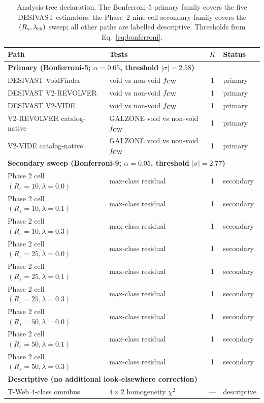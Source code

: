 \documentclass[aps,prd,twocolumn,superscriptaddress,showpacs,preprintnumbers,nofootinbib,longbibliography,floatfix]{revtex4-2}
\begin{document}
\begin{table}[ht]
\caption{Analysis-tree declaration. The Bonferroni-5 primary family
covers the five DESIVAST estimators; the Phase~2 nine-cell secondary
family covers the $(R_s, \lambda_{\rm th})$ sweep; all other paths are
labelled descriptive. Thresholds from Eq.~\eqref{eq:bonferroni}.}
\label{tab:analysis_tree}
\begin{ruledtabular}
\begin{tabular}{llcl}
Path & Tests & $K$ & Status \\
\hline
\multicolumn{4}{l}{\textbf{Primary (Bonferroni-5; $\alpha=0.05$, threshold $|\sigma|=2.58$)}} \\
DESIVAST VoidFinder & void vs non-void $f_{\rm CW}$ & 1 & primary \\
DESIVAST V2-REVOLVER & void vs non-void $f_{\rm CW}$ & 1 & primary \\
DESIVAST V2-VIDE & void vs non-void $f_{\rm CW}$ & 1 & primary \\
V2-REVOLVER catalog-native & GALZONE void vs non-void $f_{\rm CW}$ & 1 & primary \\
V2-VIDE catalog-native & GALZONE void vs non-void $f_{\rm CW}$ & 1 & primary \\
\hline
\multicolumn{4}{l}{\textbf{Secondary sweep (Bonferroni-9; $\alpha=0.05$, threshold $|\sigma|=2.77$)}} \\
Phase 2 cell $(R_s=10,\lambda=0.0)$ & max-class residual & 1 & secondary \\
Phase 2 cell $(R_s=10,\lambda=0.1)$ & max-class residual & 1 & secondary \\
Phase 2 cell $(R_s=10,\lambda=0.3)$ & max-class residual & 1 & secondary \\
Phase 2 cell $(R_s=25,\lambda=0.0)$ & max-class residual & 1 & secondary \\
Phase 2 cell $(R_s=25,\lambda=0.1)$ & max-class residual & 1 & secondary \\
Phase 2 cell $(R_s=25,\lambda=0.3)$ & max-class residual & 1 & secondary \\
Phase 2 cell $(R_s=50,\lambda=0.0)$ & max-class residual & 1 & secondary \\
Phase 2 cell $(R_s=50,\lambda=0.1)$ & max-class residual & 1 & secondary \\
Phase 2 cell $(R_s=50,\lambda=0.3)$ & max-class residual & 1 & secondary \\
\hline
\multicolumn{4}{l}{\textbf{Descriptive (no additional look-elsewhere correction)}} \\
T-Web 4-class omnibus & $4\!\times\!2$ homogeneity $\chi^2$ & --- & descriptive \\

\end{tabular}
\end{ruledtabular}
\end{table}
\end{document}
